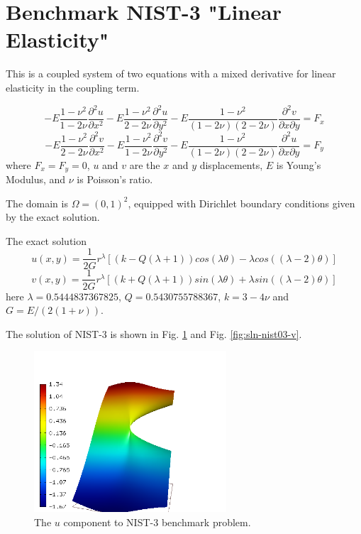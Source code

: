\documentclass[12pt]{elsarticle}
\begin{document}
\section{Benchmark NIST-3 "Linear Elasticity"}
\label{sec:bench-3}

This is a coupled system of two equations with a mixed
derivative for linear elasticity in the coupling term.

\begin{equation} \label{crack-u}
-E \frac{1-\nu^2}{1-2\nu} \frac{\partial^{2} u}{\partial x^{2}} - E\frac{1-\nu^2}{2-2 \nu} \frac{\partial^{2} u}{\partial y^{2}}
-E \frac{1-\nu^2}{(1-2\nu)(2-2\nu)} \frac{\partial^{2} v}{\partial x \partial y} = F_{x}
\end{equation}
\begin{equation} \label{crack-v}
-E \frac{1-\nu^2}{2-2\nu} \frac{\partial^{2} v}{\partial x^{2}} - E\frac{1-\nu^2}{1-2\nu} \frac{\partial^{2} v}{\partial y^{2}}
-E \frac{1-\nu^2}{(1-2\nu)(2-2\nu)} \frac{\partial^{2} u}{\partial x \partial y} = F_{y}
\end{equation}
where $F_{x} = F_{y} = 0$, $u$ and $v$ are the
$x$ and $y$ displacements, $E$ is Young's Modulus,
and $\nu$ is Poisson's ratio.

The domain is $\Omega = (0, 1)^2$, equipped with Dirichlet
boundary conditions given by the exact solution.

The exact solution
\begin{equation}\label{exact-nist-3-u-1}
u(x, y) = \frac{1}{2G} r^{\lambda}[(k - Q(\lambda + 1))cos(\lambda \theta) - \lambda cos((\lambda - 2) \theta)]
\end{equation}
\begin{equation}\label{exact-nist-3-v-1}
v(x, y) = \frac{1}{2G} r^{\lambda}[(k + Q(\lambda + 1))sin(\lambda \theta) + \lambda sin((\lambda - 2) \theta)]
\end{equation}
here $\lambda = 0.5444837367825$, $Q = 0.5430755788367$,
$k = 3 - 4 \nu$ and $G = E / (2(1 + \nu))$.

The solution of NIST-3 is shown in Fig. \ref{fig:sln-nist03-u} and Fig. \ref{fig:sln-nist03-v}.

\begin{figure}[!ht]
\centering
\includegraphics[height=6cm]{nist/nist-3/solution-u.png}
\caption{The $u$ component to NIST-3 benchmark problem.}
\label{fig:sln-nist03-u}
\end{figure}
\end{document}
